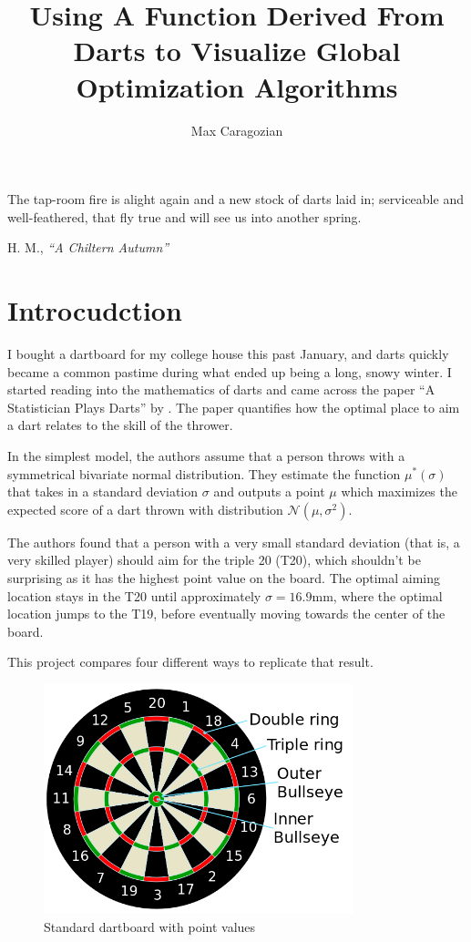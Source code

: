 \documentclass[]{article}
\title{Using A Function Derived From Darts to Visualize Global Optimization Algorithms}
\author{Max Caragozian}
\begin{document}
\maketitle


\epigraph{The tap-room fire is alight again and a new stock of darts laid in; serviceable and well-feathered, that fly true and will see us into another spring.}{H. M., \emph{``A Chiltern Autumn''} \cite{1929spectator}}

\section{Introcudction}
I bought a dartboard for my college house this past January, and darts quickly became a common pastime during what ended up being a long, snowy winter. I started reading into the mathematics of darts and came across the paper ``A Statistician Plays Darts\cite{stat}'' by \citeauthor{stat}. The paper quantifies how the optimal place to aim a dart relates to the skill of the thrower.

In the simplest model, the authors assume that a person throws with a symmetrical bivariate normal distribution. They estimate the function $\mu^*(\sigma)$ that takes in a standard deviation $\sigma$ and outputs a point $\mu$ which maximizes the expected score of a dart thrown with distribution $\mathcal{N}(\mu, \sigma^2)$.

The authors found that a person with a very small standard deviation (that is, a very skilled player) should aim for the triple 20 (T20), which shouldn't be surprising as it has the highest point value on the board. The optimal aiming location stays in the T20 until approximately $\sigma=16.9$mm, where the optimal location jumps to the T19, before eventually moving towards the center of the board.

This project compares four different ways to replicate that result.

\begin{figure}
	\centering
	\includegraphics[width=0.8\textwidth]{../images/dartboard_diagram.png}
	\caption{Standard dartboard with point values \cite{diag}}
	\label{fig:diag}
\end{figure}
\end{document}
